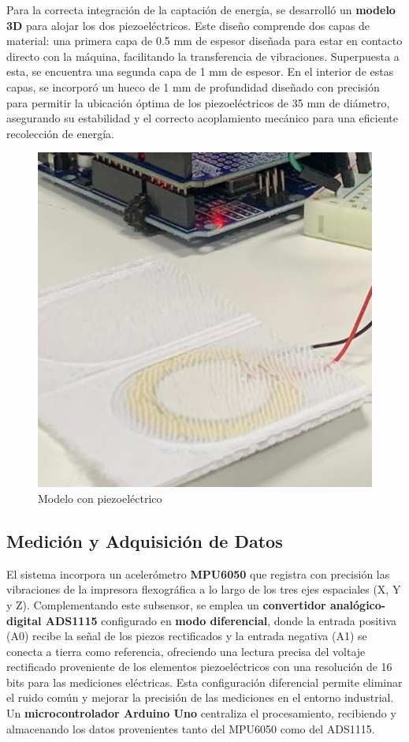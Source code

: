 \documentclass{article}
\begin{document}
\newpage
Para la correcta integración de la captación de energía, se desarrolló un \textbf{modelo 3D} para alojar los dos piezoeléctricos. Este diseño comprende dos capas de material: una primera capa de 0.5 mm de espesor diseñada para estar en contacto directo con la máquina, facilitando la transferencia de vibraciones. Superpuesta a esta, se encuentra una segunda capa de 1 mm de espesor. En el interior de estas capas, se incorporó un hueco de 1 mm de profundidad diseñado con precisión para permitir la ubicación óptima de los piezoeléctricos de 35 mm de diámetro, asegurando su estabilidad y el correcto acoplamiento mecánico para una eficiente recolección de energía.
\begin{figure}[H]
    \centering
    \includegraphics[scale=0.45]{3Dmodel.jpg}
    \caption{Modelo con piezoeléctrico}
    \label{fig:my_label}
\end{figure}
\subsection{Medición y Adquisición de Datos}
El sistema incorpora un acelerómetro \textbf{MPU6050} que registra con precisión las vibraciones de la impresora flexográfica a lo largo de los tres ejes espaciales (X, Y y Z). Complementando este subsensor, se emplea un \textbf{convertidor analógico-digital ADS1115} configurado en \textbf{modo diferencial}, donde la entrada positiva (A0) recibe la señal de los piezos rectificados y la entrada negativa (A1) se conecta a tierra como referencia, ofreciendo una lectura precisa del voltaje rectificado proveniente de los elementos piezoeléctricos con una resolución de 16 bits para las mediciones eléctricas. Esta configuración diferencial permite eliminar el ruido común y mejorar la precisión de las mediciones en el entorno industrial. Un \textbf{microcontrolador Arduino Uno} centraliza el procesamiento, recibiendo y almacenando los datos provenientes tanto del MPU6050 como del ADS1115.
\newpage
\end{document}
